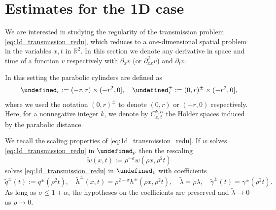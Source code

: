 \documentclass[12pt]{article}
\let\P\undefined
\numberwithin{Theorem}{section}
\theoremstyle{definition}
\theoremstyle{remark}
\numberwithin{equation}{section}
\newcommand{\p}{\partial}
\newcommand{\P}{\mathcal{P}}
\begin{document}
\section{Estimates for the 1D case}\label{sec:1dcase}
We are interested in studying the regularity of the transmission problem \eqref{eq:1d_transmission_redu},  which reduces to a one-dimensional spatial problem in the  variables $x,t$ in $\mathbb{R}^2$. In this section we denote any derivative in space and time of a function $v$ respectively with $\p_x v$ (or $\p_{xx}^2 v$) and $\p_t v$. 

In this setting the parabolic cylinders are defined as
\[
\P_r:= (-r,r) \times (-r^2,0], \quad \P_r^{\pm}:= (0,r)^\pm \times (-r^2,0], 
\]
 where we used the notation $(0,r)^{\pm}$ to denote $(0,r)$ or $(-r,0)$ respectively. Here, for a nonnegative integer $k$, we denote by $C_{x,t}^{k,{ \alpha}}$ the H\"older spaces induced by the parabolic distance.
 
 We recall the scaling properties of \eqref{eq:1d_transmission_redu}. If $w$ solves \eqref{eq:1d_transmission_redu} in $\P_\rho$ then the rescaling
\[
\tilde w (x,t):= \rho^{-\sigma} w(\rho x, \rho^2 t)
\]
solves \eqref{eq:1d_transmission_redu} in $\P_1$ with coefficients
\begin{equation} \label{eq:coeff_rescale}
    \tilde q^{\pm}(t):= q^{\pm}(\rho^2 t), \quad \tilde h^{\pm}(x,t)= \rho^{2-\sigma} h^{\pm}(\rho x, \rho^2 t), \quad \tilde \lambda = \rho \lambda, \quad \tilde\gamma^{\pm}(t) = \gamma^{\pm}(\rho^2 t).
\end{equation}
As long as $\sigma \leq 1+{ \alpha}$, the hypotheses on the coefficients are preserved and $\tilde \lambda \to 0$ as $\rho \to 0$.
\end{document}
